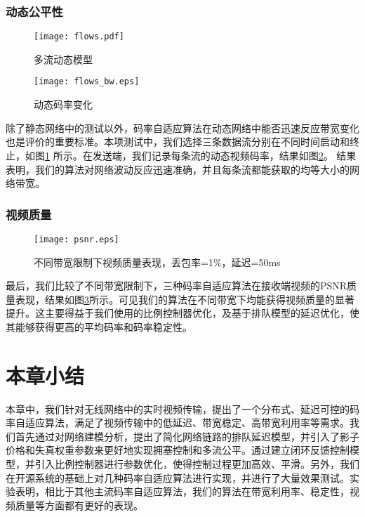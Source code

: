         \subsubsection{动态公平性}
        \begin{figure}[htbp]
          \centering
          \texttt{[image: flows.pdf]}
          \caption{多流动态模型}
          \label{pic:flows}
        \end{figure}

        \begin{figure}[htbp]
          \centering
          \texttt{[image: flows\_bw.eps]}
          \caption{动态码率变化}
          \label{pic:flows_bw}
        \end{figure}

        除了静态网络中的测试以外，码率自适应算法在动态网络中能否迅速反应带宽变化也是评价的重要标准。本项测试中，我们选择三条数据流分别在不同时间启动和终止，如图\ref{pic:flows} 所示。在发送端，我们记录每条流的动态视频码率，结果如图\ref{pic:flows_bw}。 结果表明，我们的算法对网络波动反应迅速准确，并且每条流都能获取的均等大小的网络带宽。

        \subsubsection{视频质量}
        \begin{figure}[htbp]
          \centering
          \texttt{[image: psnr.eps]}
          \caption{不同带宽限制下视频质量表现，丢包率=1\%，延迟=50ms}
          \label{pic:psnr}
        \end{figure}

        最后，我们比较了不同带宽限制下，三种码率自适应算法在接收端视频的PSNR质量表现，结果如图\ref{pic:psnr}所示。可见我们的算法在不同带宽下均能获得视频质量的显著提升。这主要得益于我们使用的比例控制器优化，及基于排队模型的延迟优化，使其能够获得更高的平均码率和码率稳定性。


\section{本章小结}
本章中，我们针对无线网络中的实时视频传输，提出了一个分布式、延迟可控的码率自适应算法，满足了视频传输中的低延迟、带宽稳定、高带宽利用率等需求。我们首先通过对网络建模分析，提出了简化网络链路的排队延迟模型，并引入了影子价格和失真权重参数来更好地实现拥塞控制和多流公平。通过建立闭环反馈控制模型，并引入比例控制器进行参数优化，使得控制过程更加高效、平滑。另外，我们在开源系统的基础上对几种码率自适应算法进行实现，并进行了大量效果测试。实验表明，相比于其他主流码率自适应算法，我们的算法在带宽利用率、稳定性，视频质量等方面都有更好的表现。
